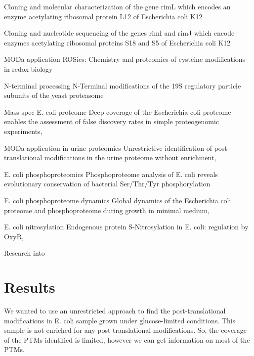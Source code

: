 \documentclass[12pt]{article}
\begin{document}
\cite{Tanakaetal1989}
{Cloning and molecular characterization of the gene rimL which encodes an enzyme acetylating ribosomal protein L12 of Escherichia coli K12}

\cite{Yoshikawaetal1987}
{Cloning and nucleotide sequencing of the genes rimI and rimJ which encode enzymes acetylating ribosomal proteins S18 and S5 of Escherichia coli K12}
   
MODa application \cite{Kimetal2014}
{ROSics: Chemistry and proteomics of cysteine modifications in redox biology}

N-terminal processing \cite{Kimuraetal2003}
{N-Terminal modifications of the 19S regulatory particle subunits of the yeast proteasome}

Mass-spec E. coli proteome \cite{Krugetal2013}
{Deep coverage of the Escherichia coli proteome enables the assessment of false discovery rates in simple proteogenomic experiments},

MODa application in urine proteomics \cite{Liuetal2013}
{Unrestrictive identification of post-translational modifications in the urine proteome without enrichment},

E. coli phosphoproteomics \cite{Maceketal2008}
{Phosphoproteome analysis of E. coli reveals evolutionary conservation of bacterial Ser/Thr/Tyr phosphorylation}

E. coli phosphoproteome dynamics \cite{Soaresetal2013}
{Global dynamics of the Escherichia coli proteome and phosphoproteome during growth in minimal medium},

E. coli nitrosylation \cite{Sethetal2012}
{Endogenous protein S-Nitrosylation in E. coli: regulation by OxyR},


Research into 

\section{Results}

We wanted to use an unrestricted approach to find the post-translational modifications in E. coli sample grown under glucose-limited conditions. This sample is not enriched for any post-translational modifications. So, the coverage of the PTMs identified is limited, however we can get information on most of the PTMs.
 
\end{document}
